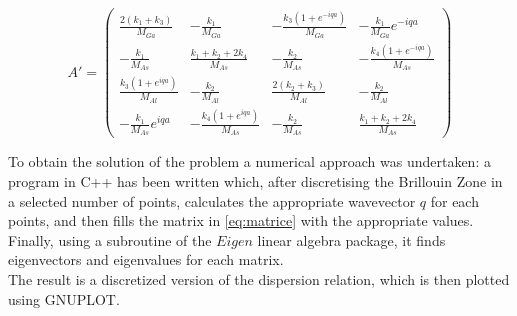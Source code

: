 \documentclass{article}
\begin{document}
\begin{equation} 
A' = \begin{pmatrix}
	\frac{2(k_1+k_3)}{M_{Ga}}				& -\frac{k_1}{M_{Ga}}  			 & -\frac{k_3(1+e^{-iqa})}{M_{Ga}} & -\frac{k_1}{M_{Ga}}e^{-iqa}  \\ 
		-\frac{k_1}{M_{As}} 						& \frac{k_1+k_2+2k_4}{M_{As}} 				 & -\frac{k_2}{M_{As}}             & -\frac{k_4(1+e^{-iqa})}{M_{As}}\\ 
		\frac{k_3(1+e^{iqa})}{M_{Al}}				& -\frac{k_2}{M_{Al}}  		 	& \frac{2(k_2+k_3)}{M_{Al}} 	 & -\frac{k_2}{M_{Al}}  \\ 
	 -\frac{k_1}{M_{As}}e^{iqa} 			& -\frac{k_4(1+e^{iqa})}{M_{As}} 					 & -\frac{k_2}{M_{As}}    & \frac{k_1+k_2+2k_4}{M_{As}}   
\end{pmatrix} 
\label{eq:matrice}
\end{equation}

\medskip

To obtain the solution of the problem a numerical approach was undertaken: a program in C++ has been written which, after discretising the Brillouin Zone in a selected number of points, calculates the appropriate wavevector $q$ for each points, and then fills the matrix in \autoref{eq:matrice} with the appropriate values. Finally, using a subroutine of the $Eigen$ linear algebra package, it finds eigenvectors and eigenvalues for each matrix.\\
The result is a discretized version of the dispersion relation, which is then plotted using GNUPLOT. \par
\end{document}
